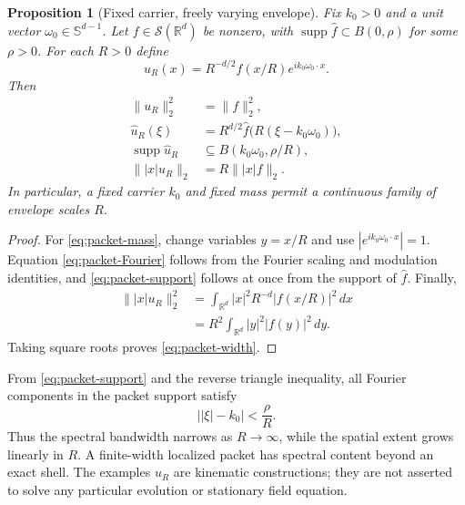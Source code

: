 \documentclass[11pt]{article}
\newtheorem{proposition}[theorem]{Proposition}
\theoremstyle{remark}
\newcommand{\R}{\mathbb{R}}
\newcommand{\supp}{\operatorname{supp}}
\begin{document}
\begin{proposition}[Fixed carrier, freely varying envelope]
\label{prop:packet}
Fix $k_0>0$ and a unit vector $\omega_0\in\mathbb S^{d-1}$.
Let $f\in\mathcal S(\R^d)$ be nonzero, with
$\supp\widehat f\subset B(0,\rho)$ for some $\rho>0$.
For each $R>0$ define
\begin{equation}
 u_R(x)=R^{-d/2}f(x/R)e^{ik_0\omega_0\cdot x}.
 \label{eq:packet}
\end{equation}
Then
\begin{align}
 \|u_R\|_2^2&=\|f\|_2^2,\label{eq:packet-mass}\\
 \widehat u_R(\xi)
 &=R^{d/2}\widehat f\bigl(R(\xi-k_0\omega_0)\bigr),
 \label{eq:packet-Fourier}\\
 \supp\widehat u_R
 &\subseteq B(k_0\omega_0,\rho/R),
 \label{eq:packet-support}\\
 \bigl\||x|u_R\bigr\|_2
 &=R\bigl\||x|f\bigr\|_2.
 \label{eq:packet-width}
\end{align}
In particular, a fixed carrier $k_0$ and fixed mass permit a
continuous family of envelope scales $R$.
\end{proposition}

\begin{proof}
For \eqref{eq:packet-mass}, change variables $y=x/R$ and use
$|e^{ik_0\omega_0\cdot x}|=1$.  Equation
\eqref{eq:packet-Fourier} follows from the Fourier scaling and
modulation identities, and \eqref{eq:packet-support} follows at once
from the support of $\widehat f$.  Finally,
\begin{align*}
 \bigl\||x|u_R\bigr\|_2^2
 &=\int_{\R^d}|x|^2R^{-d}|f(x/R)|^2\,dx\\
 &=R^2\int_{\R^d}|y|^2|f(y)|^2\,dy.
\end{align*}
Taking square roots proves \eqref{eq:packet-width}.
\end{proof}

From \eqref{eq:packet-support} and the reverse triangle inequality,
all Fourier components in the packet support satisfy
\begin{equation}
 \bigl||\xi|-k_0\bigr|<\frac{\rho}{R}.
 \label{eq:radial-bandwidth}
\end{equation}
Thus the spectral bandwidth narrows as $R\to\infty$, while the
spatial extent grows linearly in $R$.  A finite-width localized
packet has spectral content beyond an exact shell.  The examples
$u_R$ are kinematic constructions; they are not asserted to solve
any particular evolution or stationary field equation.
\end{document}
